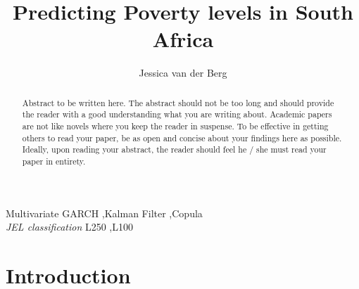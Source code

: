 \documentclass[11pt,preprint, authoryear]{elsarticle}
\numberwithin{equation}{section}
\numberwithin{figure}{section}
\numberwithin{table}{section}
\begin{document}
\begin{frontmatter}  %

\title{Predicting Poverty levels in South Africa}





\author[Add1]{Jessica van der Berg}





\address[Add1]{Stellenbosch University, South Africa}


\begin{abstract}
\small{
Abstract to be written here. The abstract should not be too long and
should provide the reader with a good understanding what you are writing
about. Academic papers are not like novels where you keep the reader in
suspense. To be effective in getting others to read your paper, be as
open and concise about your findings here as possible. Ideally, upon
reading your abstract, the reader should feel he / she must read your
paper in entirety.
}
\end{abstract}

\vspace{1cm}

\begin{keyword}
\footnotesize{
Multivariate GARCH \sep Kalman Filter \sep Copula \\ \vspace{0.3cm}
\textit{JEL classification} L250 \sep L100
}
\end{keyword}
\vspace{0.5cm}
\end{frontmatter}



\pagestyle{fancy}
\chead{}
\rhead{}
\lfoot{}
\lhead{}
\cfoot{}


\headsep 35pt %




\hypertarget{introduction}{%
\section{\texorpdfstring{Introduction
\label{Introduction}}{Introduction }}\label{introduction}}
\end{document}
